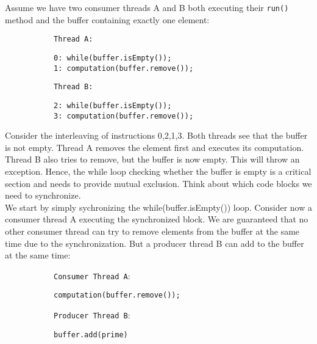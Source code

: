 \documentclass[main.tex]{subfiles}
\begin{document}
Assume we have two consumer threads A and B both executing their \texttt{run()} method and the buffer containing exactly one element:
\begin{figure}[H]
    \begin{subfigure}{.52\textwidth}
        \texttt{Thread A:}
        \begin{verbatim}
0: while(buffer.isEmpty());
1: computation(buffer.remove());
            \end{verbatim}
        \end{subfigure}%
        \begin{subfigure}{.52\textwidth}
            \texttt{Thread B:}
            \begin{verbatim}
2: while(buffer.isEmpty());
3: computation(buffer.remove());
            \end{verbatim}
        \end{subfigure}
    \end{figure}
Consider the interleaving of instructions 0,2,1,3. Both threads see that the buffer is not empty. Thread A removes the element first and executes its computation. Thread B also tries to remove, but the buffer is now empty. This will throw an exception. Hence, the while loop checking whether the buffer is empty is a critical section and needs to provide mutual exclusion. Think about which code blocks we need to synchronize.\\[3mm]
We start by simply sychronizing the while(buffer.isEmpty()) loop. Consider now a consumer thread A executing the synchronized block. We are guaranteed that no other consumer thread can try to remove elements from the buffer at the same time due to the synchronization. But a producer thread B can add to the buffer at the same time:
\begin{figure}[H]
    \begin{subfigure}{.52\textwidth}
        \texttt{Consumer Thread A}:
        \begin{verbatim}
computation(buffer.remove());
        \end{verbatim}
    \end{subfigure}%
    \begin{subfigure}{.52\textwidth}
        \texttt{Producer Thread B}:
        \begin{verbatim}
buffer.add(prime)
        \end{verbatim}
    \end{subfigure}
\end{figure}
\end{document}
